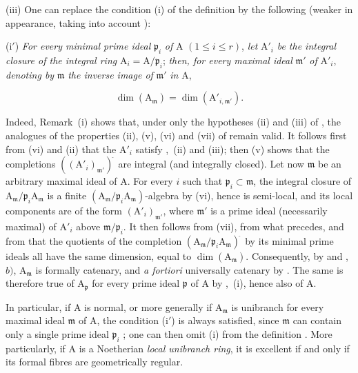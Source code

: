 \begin{remarks}[7.8.4]
(iii) One can replace the condition (i) of the definition  by the following (weaker in appearance, taking into account ):

(i$'$) \emph{For every minimal prime ideal} $\mathfrak{p}_i$ \emph{of} $\mathrm{A}$ $(1\leqslant i\leqslant r)$, \emph{let} $\mathrm{A}'_i$ \emph{be the integral closure of the integral ring} $\mathrm{A}_i=\mathrm{A}/\mathfrak{p}_i$; \emph{then, for every maximal ideal} $\mathfrak{m}'$ \emph{of} $\mathrm{A}'_i$, \emph{denoting by} $\mathfrak{m}$ \emph{the inverse image of} $\mathfrak{m}'$ \emph{in} $\mathrm{A}$,

\begin{env}[7.8.4.1]
\label{IV.7.8.4.1}
\[
  \dim(\mathrm{A}_\mathfrak{m})=\dim(\mathrm{A}'_{i,\mathfrak{m}'}).
\]
\end{env}

Indeed, Remark~(i) shows that, under only the hypotheses (ii) and (iii) of , the analogues of the properties (ii), (v), (vi) and (vii) of  remain valid. It follows first from (vi) and (ii) that the $\mathrm{A}'_i$ satisfy ,~(ii) and (iii); then (v) shows that the completions $((\mathrm{A}'_i)_{\mathfrak{m}'})^{\widehat{\,}}$ are integral (and integrally closed). Let now $\mathfrak{m}$ be an arbitrary maximal ideal of $\mathrm{A}$. For every $i$ such that $\mathfrak{p}_i\subset\mathfrak{m}$, the integral closure of $\mathrm{A}_\mathfrak{m}/\mathfrak{p}_i\mathrm{A}_\mathfrak{m}$ is a finite $(\mathrm{A}_\mathfrak{m}/\mathfrak{p}_i\mathrm{A}_\mathfrak{m})$-algebra by (vi), hence is semi-local, and its local components are of the form $(\mathrm{A}'_i)_{\mathfrak{m}'}$, where $\mathfrak{m}'$ is a prime ideal (necessarily maximal) of $\mathrm{A}'_i$ above $\mathfrak{m}/\mathfrak{p}_i$. It then follows from (vii), from what precedes, and from  that the quotients of the completion $(\mathrm{A}_\mathfrak{m}/\mathfrak{p}_i\mathrm{A}_\mathfrak{m})^{\widehat{\,}}$ by its minimal prime ideals all have the same dimension, equal to $\dim(\mathrm{A}_\mathfrak{m})$. Consequently, by  and ,~$b)$, $\mathrm{A}_\mathfrak{m}$ is formally catenary, and \emph{a fortiori} universally catenary by . The same is therefore true of $\mathrm{A}_\mathfrak{p}$ for every prime ideal $\mathfrak{p}$ of $\mathrm{A}$ by ,~(i), hence also of $\mathrm{A}$.

In particular, if $\mathrm{A}$ is normal, or more generally if $\mathrm{A}_\mathfrak{m}$ is unibranch for every maximal ideal $\mathfrak{m}$ of $\mathrm{A}$, the condition (i$'$) is always satisfied, since $\mathfrak{m}$ can contain only a single prime ideal $\mathfrak{p}_i$ ; one can then omit (i) from the definition . More particularly, if $\mathrm{A}$ is a Noetherian \emph{local unibranch ring}, it is excellent if and only if its formal fibres are geometrically regular.


\end{remarks}
